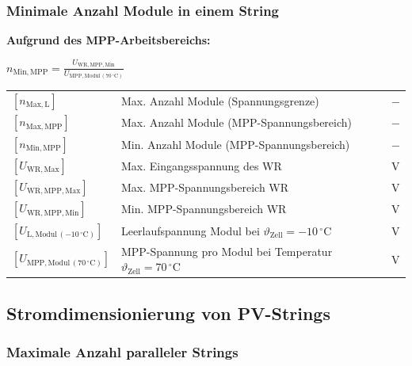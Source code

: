 \vspace{0.1cm}



\subsubsection{Minimale Anzahl Module in einem String}

\textbf{Aufgrund des MPP-Arbeitsbereichs:}

$
\boxed{
n_{\mathrm{Min,MPP}} = \frac{U_{\mathrm{WR,MPP,Min}}}{U_{\mathrm{MPP,Modul \, (70 \, ^\circ\mathrm{C})}}}
}
$

\vspace{0.1cm}

\renewcommand{\arraystretch}{1.2}
\begin{tabular}{@{} l p{6.5cm} l @{}}
    $[n_{\mathrm{Max,L}}]$        & Max. Anzahl Module (Spannungsgrenze) \dotfill & $-$ \\
    $[n_{\mathrm{Max,MPP}}]$      & Max. Anzahl Module (MPP-Spannungsbereich) \dotfill & $-$ \\
    $[n_{\mathrm{Min,MPP}}]$      & Min. Anzahl Module (MPP-Spannungsbereich) \dotfill & $-$ \\
    $[U_{\mathrm{WR,Max}}]$       & Max. Eingangsspannung des WR \dotfill & $\mathrm{V}$ \\
    $[U_{\mathrm{WR,MPP,Max}}]$   & Max. MPP-Spannungsbereich WR \dotfill & $\mathrm{V}$ \\
    $[U_{\mathrm{WR,MPP,Min}}]$   & Min. MPP-Spannungsbereich WR \dotfill & $\mathrm{V}$ \\
    $[U_{\mathrm{L,Modul \, (-10 \, ^\circ\mathrm{C})}}]$    & Leerlaufspannung Modul bei $\vartheta_{\mathrm{Zell}} =  -10 \, ^\circ \mathrm{C}$ \dotfill & $\mathrm{V}$ \\
    $[U_{\mathrm{MPP,Modul \, (70 \, ^\circ\mathrm{C})}}]$ & MPP-Spannung pro Modul bei Temperatur $\vartheta_{\mathrm{Zell}} = 70 \, ^\circ\mathrm{C}$ \dotfill & $\mathrm{V}$ \\
\end{tabular}



\subsection{Stromdimensionierung von PV-Strings}

\subsubsection{Maximale Anzahl paralleler Strings}

